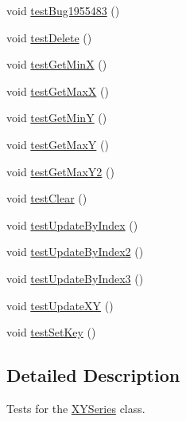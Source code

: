 \begin{DoxyCompactItemize}
void \mbox{\hyperlink{classorg_1_1jfree_1_1data_1_1xy_1_1_x_y_series_test_a450f5615c325a9face1b96ad7d428ea5}{test\+Bug1955483}} ()
\item 
void \mbox{\hyperlink{classorg_1_1jfree_1_1data_1_1xy_1_1_x_y_series_test_ac1cdbe90c91d407d2110e209d4d3ca66}{test\+Delete}} ()
\item 
void \mbox{\hyperlink{classorg_1_1jfree_1_1data_1_1xy_1_1_x_y_series_test_a8f76b40826c07da92c75cd927cec4797}{test\+Get\+MinX}} ()
\item 
void \mbox{\hyperlink{classorg_1_1jfree_1_1data_1_1xy_1_1_x_y_series_test_a270ca4a7688e85058d042d68cd694af7}{test\+Get\+MaxX}} ()
\item 
void \mbox{\hyperlink{classorg_1_1jfree_1_1data_1_1xy_1_1_x_y_series_test_a6f83642063c496d08827a96cc8284bcd}{test\+Get\+MinY}} ()
\item 
void \mbox{\hyperlink{classorg_1_1jfree_1_1data_1_1xy_1_1_x_y_series_test_ac1a0b585e1e2d9fc89a76ee07ff2ca22}{test\+Get\+MaxY}} ()
\item 
void \mbox{\hyperlink{classorg_1_1jfree_1_1data_1_1xy_1_1_x_y_series_test_a2c0b19d6e19c1a7dd8697f0cdf1665b6}{test\+Get\+Max\+Y2}} ()
\item 
void \mbox{\hyperlink{classorg_1_1jfree_1_1data_1_1xy_1_1_x_y_series_test_ab395f14b4fa5f5241ad58c827706fb04}{test\+Clear}} ()
\item 
void \mbox{\hyperlink{classorg_1_1jfree_1_1data_1_1xy_1_1_x_y_series_test_af3f36afb356ae392cebb1e3591f5353d}{test\+Update\+By\+Index}} ()
\item 
void \mbox{\hyperlink{classorg_1_1jfree_1_1data_1_1xy_1_1_x_y_series_test_ab3ffc86640c706154174f39ff8086d91}{test\+Update\+By\+Index2}} ()
\item 
void \mbox{\hyperlink{classorg_1_1jfree_1_1data_1_1xy_1_1_x_y_series_test_ad90b360984be33e977e5e129491dccd6}{test\+Update\+By\+Index3}} ()
\item 
void \mbox{\hyperlink{classorg_1_1jfree_1_1data_1_1xy_1_1_x_y_series_test_a385565188bc02fb6f4e9cb215b9278e4}{test\+Update\+XY}} ()
\item 
void \mbox{\hyperlink{classorg_1_1jfree_1_1data_1_1xy_1_1_x_y_series_test_a52ba3a1d8ca08aebef7f4c6e8e11fef7}{test\+Set\+Key}} ()
\end{DoxyCompactItemize}


\subsection{Detailed Description}
Tests for the \mbox{\hyperlink{classorg_1_1jfree_1_1data_1_1xy_1_1_x_y_series}{X\+Y\+Series}} class. 

